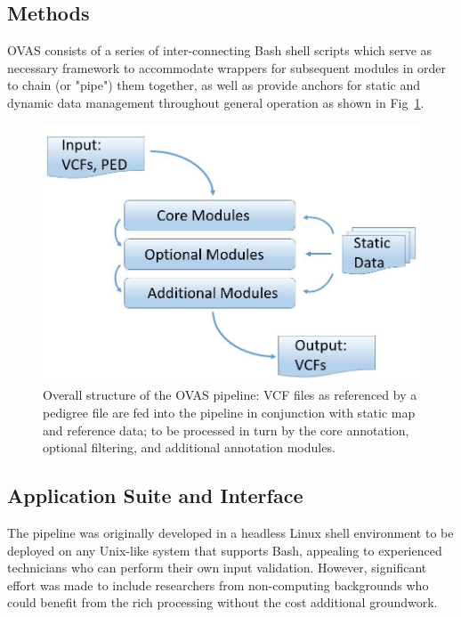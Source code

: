 \documentclass{bioinfo}
\def\app{OVAS}
\begin{document}
\begin{methods}

\section{Methods}

\app{} consists of a series of inter-connecting Bash shell scripts which serve as necessary framework to accommodate wrappers for subsequent modules in order to chain (or "pipe") them together, as well as provide anchors for static and dynamic data management throughout general operation as shown in Fig~\ref{fig:structure}.

\begin{figure}[!tpb]
  \centerline{\includegraphics[natwidth=180bp,natheight=120bp]{structure.jpg}}\caption{Overall structure of the \app{} pipeline: VCF files as referenced by a pedigree file are fed into the pipeline in conjunction with static map and reference data; to be processed in turn by the core annotation, optional filtering, and additional annotation modules.}\label{fig:structure}
\end{figure}


 
\subsection{Application Suite and Interface}

The pipeline was originally developed in a headless Linux shell environment to be deployed on any Unix-like system that supports Bash, appealing to experienced technicians who can perform their own input validation. However, significant effort was made to include researchers from non-computing backgrounds who could benefit from the rich processing without the cost additional groundwork.



\end{methods}
\end{document}
